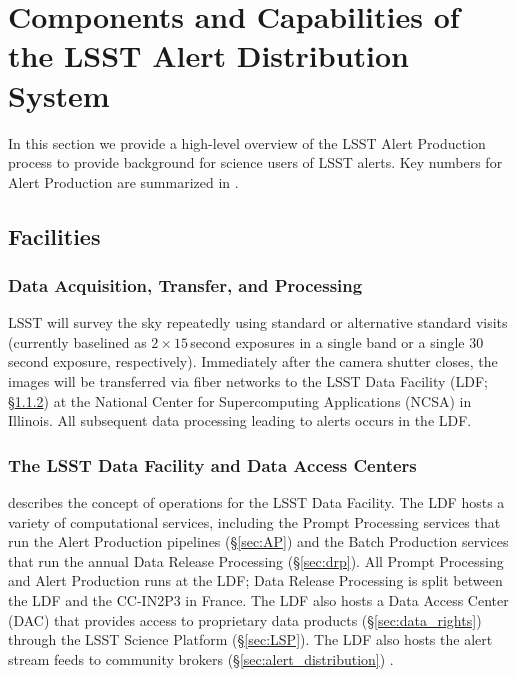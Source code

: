\section{Components and Capabilities of the LSST Alert Distribution System}\label{sec:components}

In this section we provide a high-level overview of the LSST Alert Production process to provide background for science users of LSST alerts.
Key numbers for Alert Production are summarized in .

\subsection{Facilities}

\subsubsection{Data Acquisition, Transfer, and Processing}

LSST will survey the sky repeatedly using standard or alternative standard visits (currently baselined as $2\times15$\,second exposures in a single band or a single 30\,second exposure, respectively).
Immediately after the camera shutter closes, the images will be transferred via fiber networks to the LSST Data Facility (LDF; \S \ref{sec:LDF}) at the National Center for Supercomputing Applications (NCSA) in Illinois.
All subsequent data processing leading to alerts occurs in the LDF.

\subsubsection{The LSST Data Facility and Data Access Centers} \label{sec:LDF}

 describes the concept of operations for the LSST Data Facility.
The LDF hosts a variety of computational services, including the Prompt Processing services that run the Alert Production pipelines (\S \ref{sec:AP}) and the Batch Production services that run the annual Data Release Processing (\S \ref{sec:drp}).
All Prompt Processing and Alert Production runs at the LDF;
Data Release Processing is split between the LDF and the CC-IN2P3 in France.
The LDF also hosts a Data Access Center (DAC) that provides access to proprietary data products (\S \ref{sec:data_rights}) through the LSST Science Platform (\S \ref{sec:LSP}).
The LDF also hosts the alert stream feeds to community brokers (\S \ref{sec:alert_distribution}) .

